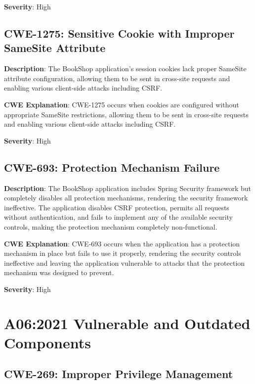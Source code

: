 \documentclass[]{UCD_CS_FYP_Report}
\begin{document}
\textbf{Severity}: High



\section{CWE-1275: Sensitive Cookie with Improper SameSite Attribute}

\textbf{Description}: The BookShop application's session cookies lack proper SameSite attribute configuration, allowing them to be sent in cross-site requests and enabling various client-side attacks including CSRF.

\textbf{CWE Explanation}: CWE-1275 occurs when cookies are configured without appropriate SameSite restrictions, allowing them to be sent in cross-site requests and enabling various client-side attacks including CSRF.

\textbf{Severity}: High



\section{CWE-693: Protection Mechanism Failure}

\textbf{Description}: The BookShop application includes Spring Security framework but completely disables all protection mechanisms, rendering the security framework ineffective. The application disables CSRF protection, permits all requests without authentication, and fails to implement any of the available security controls, making the protection mechanism completely non-functional.

\textbf{CWE Explanation}: CWE-693 occurs when the application has a protection mechanism in place but fails to use it properly, rendering the security controls ineffective and leaving the application vulnerable to attacks that the protection mechanism was designed to prevent.

\textbf{Severity}: High



\chapter{A06:2021 Vulnerable and Outdated Components}

\section{CWE-269: Improper Privilege Management}
\end{document}
